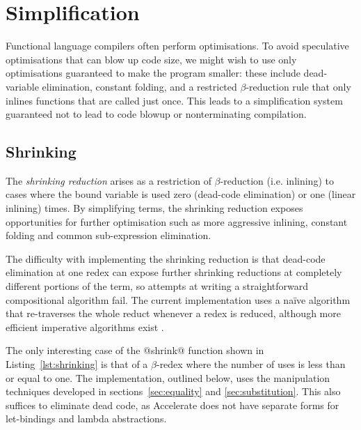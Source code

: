 

\section{Simplification}
\label{sec:simplification}

Functional language compilers often perform optimisations. To avoid speculative
optimisations that can blow up code size, we might wish to use only
optimisations guaranteed to make the program smaller: these include
dead-variable elimination, constant folding, and a restricted $\beta$-reduction
rule that only inlines functions that are called just once. This leads to a
simplification system guaranteed not to lead to code blowup or nonterminating
compilation.

\subsection{Shrinking}

The \emph{shrinking reduction} arises as a restriction of $\beta$-reduction
(i.e. inlining) to cases where the bound variable is used zero (dead-code
elimination) or one (linear inlining) times. By simplifying terms,
the shrinking reduction exposes opportunities for further optimisation such as
more aggressive inlining, constant folding and common sub-expression
elimination. %

The difficulty with implementing the shrinking reduction is that dead-code
elimination at one redex can expose further shrinking reductions at completely
different portions of the term, so attempts at writing a straightforward
compositional algorithm fail. The current implementation uses a na\"ive
algorithm that re-traverses the whole reduct whenever a redex is reduced,
although more efficient imperative algorithms exist
\cite{Appel:1997gs,Benton:2004ua,Kennedy:2007cb}.

The only interesting case of the @shrink@ function shown in
Listing~\ref{lst:shrinking} is that of a
$\beta$-redex where the number of uses is less than or equal to one. The
implementation, outlined below, uses the  manipulation
techniques developed in sections~\ref{sec:equality} and \ref{sec:substitution}.
This also suffices to eliminate dead code, as Accelerate does not have separate
forms for let-bindings and lambda abstractions.

